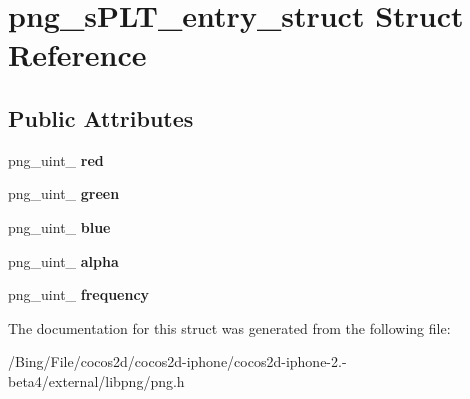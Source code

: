 \hypertarget{structpng__s_p_l_t__entry__struct}{\section{png\-\_\-s\-P\-L\-T\-\_\-entry\-\_\-struct Struct Reference}
\label{structpng__s_p_l_t__entry__struct}
}
\subsection*{Public Attributes}
\begin{DoxyCompactItemize}
\item 
\hypertarget{structpng__s_p_l_t__entry__struct_a05ba3cef8aa2c43d1f52c0300c525fd9}{png\-\_\-uint\-\_ {\bfseries red}}\label{structpng__s_p_l_t__entry__struct_a05ba3cef8aa2c43d1f52c0300c525fd9}

\item 
\hypertarget{structpng__s_p_l_t__entry__struct_a3b4269fb63b4087bd618a6741b805554}{png\-\_\-uint\-\_ {\bfseries green}}\label{structpng__s_p_l_t__entry__struct_a3b4269fb63b4087bd618a6741b805554}

\item 
\hypertarget{structpng__s_p_l_t__entry__struct_a2af6281d3b400362886a43977ebcb7db}{png\-\_\-uint\-\_ {\bfseries blue}}\label{structpng__s_p_l_t__entry__struct_a2af6281d3b400362886a43977ebcb7db}

\item 
\hypertarget{structpng__s_p_l_t__entry__struct_abea98962a064e2a05f460b9f2ea2f47b}{png\-\_\-uint\-\_ {\bfseries alpha}}\label{structpng__s_p_l_t__entry__struct_abea98962a064e2a05f460b9f2ea2f47b}

\item 
\hypertarget{structpng__s_p_l_t__entry__struct_ad8095a15bb5a054c12ef911478c5f3a3}{png\-\_\-uint\-\_ {\bfseries frequency}}\label{structpng__s_p_l_t__entry__struct_ad8095a15bb5a054c12ef911478c5f3a3}

\end{DoxyCompactItemize}


The documentation for this struct was generated from the following file\-:\begin{DoxyCompactItemize}
\item 
/\-Bing/\-File/cocos2d/cocos2d-\/iphone/cocos2d-\/iphone-\/2.-\/beta4/external/libpng/png.\-h\end{DoxyCompactItemize}
